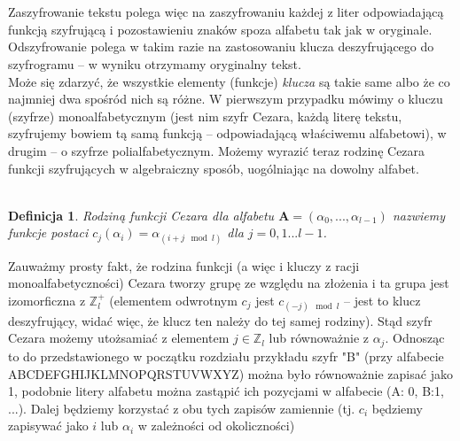 \documentclass[a4paper]{article}
\theoremstyle{defn}
\newtheorem{defn}{Definicja}[subsection]
\theoremstyle{theorem}
\theoremstyle{lemma}
\theoremstyle{cor}
\theoremstyle{fact}
\begin{document}
\\
\\
Zaszyfrowanie tekstu polega więc na zaszyfrowaniu każdej z liter odpowiadającą funkcją szyfrującą i pozostawieniu znaków spoza alfabetu tak jak w oryginale. Odszyfrowanie polega w takim razie na zastosowaniu klucza deszyfrującego do szyfrogramu – w wyniku otrzymamy oryginalny tekst.\\
Może się zdarzyć, że wszystkie elementy (funkcje) \textit{klucza} są takie same albo że co najmniej dwa spośród nich są różne. W pierwszym przypadku mówimy o kluczu (szyfrze) monoalfabetycznym (jest nim szyfr Cezara, każdą literę tekstu, szyfrujemy bowiem tą samą funkcją – odpowiadającą właściwemu alfabetowi), w drugim – o szyfrze polialfabetycznym.
Możemy wyrazić teraz rodzinę Cezara funkcji szyfrujących w algebraiczny sposób, uogólniając na dowolny alfabet.\\\\
\begin{defn}\label{defn4.1.5}
Rodziną funkcji Cezara dla alfabetu $\boldsymbol{A} = (\alpha_0, ..., \alpha_{l-1})$ nazwiemy funkcje postaci $c_j(\alpha_i) = \alpha_{(i+j \mod l)}$ dla $j = 0,1...l-1$.
\end{defn}
Zauważmy prosty fakt, że rodzina funkcji (a więc i kluczy z racji monoalfabetyczności) Cezara tworzy grupę ze względu na złożenia i ta grupa jest izomorficzna z $\mathbb{Z}_l^+$ (elementem odwrotnym $c_{j}$ jest $c_{(-j) \mod l}$ – jest to klucz deszyfrujący, widać więc, że klucz ten należy do tej samej rodziny). Stąd szyfr Cezara możemy utożsamiać z elementem $j \in \mathbb{Z}_l$ lub równoważnie z $\alpha_j$. Odnosząc to do przedstawionego w początku rozdziału przykładu szyfr "B" (przy alfabecie ABCDEFGHIJKLMNOPQRSTUVWXYZ) można było równoważnie zapisać jako 1, podobnie litery alfabetu można zastąpić ich pozycjami w alfabecie (A: 0, B:1, ...).  Dalej będziemy korzystać z obu tych zapisów zamiennie (tj. $c_i$ będziemy zapisywać jako $i$ lub $\alpha_i$ w zależności od okoliczności)\\
\end{document}
